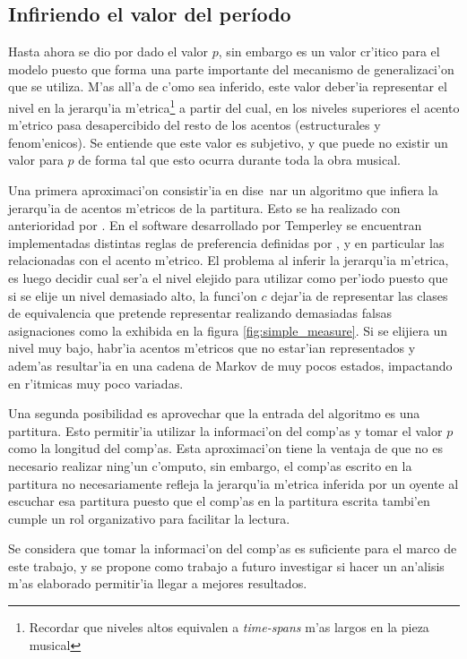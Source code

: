 \subsection{Infiriendo el valor del per\'iodo}
Hasta ahora se dio por dado el valor $p$, sin embargo es un valor cr'itico para el modelo puesto que forma una parte importante del mecanismo de 
generalizaci'on que se utiliza. 
M'as all'a de c'omo sea inferido, este valor deber'ia representar el nivel en la jerarqu'ia m'etrica\footnote{Recordar que niveles altos equivalen a \emph{time-spans} m'as largos en la pieza musical} a partir 
del cual, en los niveles superiores el acento m'etrico pasa desapercibido del resto de los acentos (estructurales y fenom'enicos). 
Se entiende que este valor es subjetivo, y que puede no existir un valor para $p$ de forma tal que esto ocurra durante toda la obra musical.


Una primera aproximaci'on consistir'ia en dise~nar un algoritmo que infiera la jerarqu'ia de acentos m'etricos de la partitura. 
Esto se ha realizado con anterioridad por \cite{Temperley2001}. En el software desarrollado por Temperley se encuentran implementadas distintas 
reglas de preferencia definidas por \cite{LerdahlJackendoff83}, y en particular las relacionadas con el acento m'etrico. El problema al inferir la 
jerarqu'ia m'etrica, es luego decidir cual ser'a el nivel elejido para utilizar como per'iodo puesto que si se elije un nivel demasiado alto, 
la funci'on $c$ dejar'ia de representar las clases de equivalencia que pretende representar realizando demasiadas falsas asignaciones como la 
exhibida en la figura \ref{fig:simple_measure}. Si se elijiera un nivel muy bajo, habr'ia acentos m'etricos que no estar'ian representados 
y adem'as resultar'ia en una cadena de Markov de muy pocos estados, impactando en r'itmicas muy poco variadas. 

Una segunda posibilidad es aprovechar que la entrada del algoritmo es una partitura. Esto permitir'ia utilizar la informaci'on del 
comp'as y tomar el valor $p$ como la longitud del comp'as. 
Esta aproximaci'on tiene la ventaja de que no es necesario realizar ning'un c'omputo, sin embargo, el comp'as escrito en la partitura no necesariamente 
refleja la jerarqu'ia m'etrica inferida por un oyente al escuchar esa partitura puesto que el comp'as en la partitura escrita tambi'en cumple 
un rol organizativo para facilitar la lectura. 

Se considera que tomar la informaci'on del comp'as es suficiente para el marco de este trabajo, y se propone como trabajo a futuro investigar 
si hacer un an'alisis m'as elaborado permitir'ia llegar a mejores resultados. 

